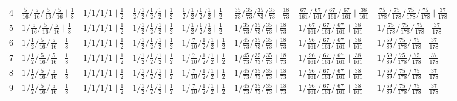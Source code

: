 {\begin{tabular}{rlllllll}
4 & $\tfrac{5}{16}/\tfrac{5}{16}/\tfrac{5}{16}/\tfrac{5}{16} \mid \tfrac{1}{8}$ & $1/1/1/1 \mid \tfrac{1}{2}$ & $\tfrac{1}{2}/\tfrac{1}{2}/\tfrac{1}{2}/\tfrac{1}{2} \mid \tfrac{1}{2}$ & $\tfrac{1}{2}/\tfrac{1}{2}/\tfrac{1}{2}/\tfrac{1}{2} \mid \tfrac{1}{2}$ & $\tfrac{35}{73}/\tfrac{35}{73}/\tfrac{35}{73}/\tfrac{35}{73} \mid \tfrac{18}{73}$ & $\tfrac{67}{161}/\tfrac{67}{161}/\tfrac{67}{161}/\tfrac{67}{161} \mid \tfrac{38}{161}$ & $\tfrac{75}{178}/\tfrac{75}{178}/\tfrac{75}{178}/\tfrac{75}{178} \mid \tfrac{37}{178}$\\
5 & $1/\tfrac{5}{16}/\tfrac{5}{16}/\tfrac{5}{16} \mid \tfrac{1}{8}$ & $1/1/1/1 \mid \tfrac{1}{2}$ & $1/\tfrac{1}{2}/\tfrac{1}{2}/\tfrac{1}{2} \mid \tfrac{1}{2}$ & $1/\tfrac{1}{2}/\tfrac{1}{2}/\tfrac{1}{2} \mid \tfrac{1}{2}$ & $1/\tfrac{35}{73}/\tfrac{35}{73}/\tfrac{35}{73} \mid \tfrac{18}{73}$ & $1/\tfrac{67}{161}/\tfrac{67}{161}/\tfrac{67}{161} \mid \tfrac{38}{161}$ & $1/\tfrac{75}{178}/\tfrac{75}{178}/\tfrac{75}{178} \mid \tfrac{37}{178}$\\
6 & $1/\tfrac{1}{2}/\tfrac{5}{16}/\tfrac{5}{16} \mid \tfrac{1}{8}$ & $1/1/1/1 \mid \tfrac{1}{2}$ & $1/\tfrac{1}{2}/\tfrac{1}{2}/\tfrac{1}{2} \mid \tfrac{1}{2}$ & $1/\tfrac{7}{10}/\tfrac{1}{2}/\tfrac{1}{2} \mid \tfrac{1}{2}$ & $1/\tfrac{45}{73}/\tfrac{35}{73}/\tfrac{35}{73} \mid \tfrac{18}{73}$ & $1/\tfrac{96}{161}/\tfrac{67}{161}/\tfrac{67}{161} \mid \tfrac{38}{161}$ & $1/\tfrac{59}{89}/\tfrac{75}{178}/\tfrac{75}{178} \mid \tfrac{37}{178}$\\
7 & $1/\tfrac{1}{2}/\tfrac{5}{16}/\tfrac{5}{16} \mid \tfrac{1}{8}$ & $1/1/1/1 \mid \tfrac{1}{2}$ & $1/\tfrac{1}{2}/\tfrac{1}{2}/\tfrac{1}{2} \mid \tfrac{1}{2}$ & $1/\tfrac{7}{10}/\tfrac{1}{2}/\tfrac{1}{2} \mid \tfrac{1}{2}$ & $1/\tfrac{45}{73}/\tfrac{35}{73}/\tfrac{35}{73} \mid \tfrac{18}{73}$ & $1/\tfrac{96}{161}/\tfrac{67}{161}/\tfrac{67}{161} \mid \tfrac{38}{161}$ & $1/\tfrac{59}{89}/\tfrac{75}{178}/\tfrac{75}{178} \mid \tfrac{37}{178}$\\
8 & $1/\tfrac{1}{2}/\tfrac{5}{16}/\tfrac{5}{16} \mid \tfrac{1}{8}$ & $1/1/1/1 \mid \tfrac{1}{2}$ & $1/\tfrac{1}{2}/\tfrac{1}{2}/\tfrac{1}{2} \mid \tfrac{1}{2}$ & $1/\tfrac{7}{10}/\tfrac{1}{2}/\tfrac{1}{2} \mid \tfrac{1}{2}$ & $1/\tfrac{45}{73}/\tfrac{35}{73}/\tfrac{35}{73} \mid \tfrac{18}{73}$ & $1/\tfrac{96}{161}/\tfrac{67}{161}/\tfrac{67}{161} \mid \tfrac{38}{161}$ & $1/\tfrac{59}{89}/\tfrac{75}{178}/\tfrac{75}{178} \mid \tfrac{37}{178}$\\
9 & $1/\tfrac{1}{2}/\tfrac{5}{16}/\tfrac{5}{16} \mid \tfrac{1}{8}$ & $1/1/1/1 \mid \tfrac{1}{2}$ & $1/\tfrac{1}{2}/\tfrac{1}{2}/\tfrac{1}{2} \mid \tfrac{1}{2}$ & $1/\tfrac{7}{10}/\tfrac{1}{2}/\tfrac{1}{2} \mid \tfrac{1}{2}$ & $1/\tfrac{45}{73}/\tfrac{35}{73}/\tfrac{35}{73} \mid \tfrac{18}{73}$ & $1/\tfrac{96}{161}/\tfrac{67}{161}/\tfrac{67}{161} \mid \tfrac{38}{161}$ & $1/\tfrac{59}{89}/\tfrac{75}{178}/\tfrac{75}{178} \mid \tfrac{37}{178}$\\

\end{tabular}}
